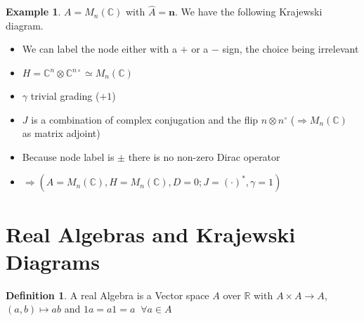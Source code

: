 \documentclass[a4paper]{article}
\theoremstyle{definition}
\newtheorem{definition}{Definition}
\theoremstyle{definition}
\theoremstyle{definition}
\newtheorem{example}{Example}
\theoremstyle{theorem}
\theoremstyle{theorem}
\theoremstyle{theorem}
\begin{document}
\begin{example}
    $A = M_n(\mathbb{C})$ with $\hat{A} = {\textbf{n}}$. We have the following
    Krajewski diagram.
    \begin{figure}[h!] \centering
    \end{figure}
    \begin{itemize}
        \item We can label the node either with a $+$ or a $-$ sign, the choice being
            irrelevant
        \item $H = \mathbb{C}^n \otimes \mathbb{C}^{n\circ} \simeq
            M_n(\mathbb{C})$
        \item $\gamma$ trivial grading ($+1$)
        \item $J$ is a combination of complex conjugation and the flip
            $n\otimes n^\circ$ ($\Rightarrow M_n(\mathbb{C})$ as matrix adjoint)
        \item Because node label is $\pm$ there is no non-zero Dirac operator
        \item $\Rightarrow (A = M_n(\mathbb{C}), H=M_n(\mathbb{C}) , D=0; J=(\cdot)^*,
            \gamma = 1)$
    \end{itemize}
\end{example}
\section{Real Algebras and Krajewski Diagrams}

\begin{definition}
    A real Algebra is a Vector space $A$ over $\mathbb{R}$ with $A\times A
    \rightarrow A$, $(a, b) \mapsto ab$ and $1a = a1 = a \;\; \forall a\in A$
\end{definition}
\end{document}
